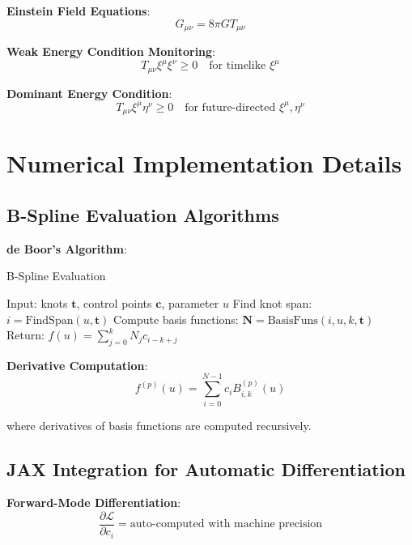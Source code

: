 \documentclass[11pt,a4paper]{article}
\begin{document}
\textbf{Einstein Field Equations}:
\begin{equation}
G_{\mu\nu} = 8\pi G T_{\mu\nu}
\end{equation}

\textbf{Weak Energy Condition Monitoring}:
\begin{equation}
T_{\mu\nu} \xi^\mu \xi^\nu \geq 0 \quad \text{for timelike } \xi^\mu
\end{equation}

\textbf{Dominant Energy Condition}:
\begin{equation}
T_{\mu\nu} \xi^\mu \eta^\nu \geq 0 \quad \text{for future-directed } \xi^\mu, \eta^\nu
\end{equation}

\section{Numerical Implementation Details}

\subsection{B-Spline Evaluation Algorithms}

\textbf{de Boor's Algorithm}:
\begin{algorithm}[H]
\caption{B-Spline Evaluation}
\begin{algorithmic}
\STATE Input: knots $\mathbf{t}$, control points $\mathbf{c}$, parameter $u$
\STATE Find knot span: $i = \text{FindSpan}(u, \mathbf{t})$
\STATE Compute basis functions: $\mathbf{N} = \text{BasisFuns}(i, u, k, \mathbf{t})$
\STATE Return: $f(u) = \sum_{j=0}^{k} N_j c_{i-k+j}$
\end{algorithmic}
\end{algorithm}

\textbf{Derivative Computation}:
\begin{equation}
f^{(p)}(u) = \sum_{i=0}^{N-1} c_i B_{i,k}^{(p)}(u)
\end{equation}

where derivatives of basis functions are computed recursively.

\subsection{JAX Integration for Automatic Differentiation}

\textbf{Forward-Mode Differentiation}:
\begin{equation}
\frac{\partial \mathcal{L}}{\partial c_i} = \text{auto-computed with machine precision}
\end{equation}
\end{document}
